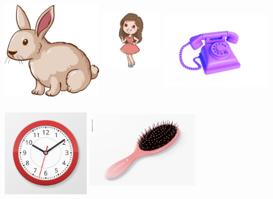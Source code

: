 \includegraphics[width=1.66771in,height=1.63535in]{media/image70.png}
\includegraphics[width=1.03234in,height=1.99479in]{media/image72.png} 
\includegraphics[width=1.86146in,height=1.63165in]{media/image73.png}
\includegraphics[width=1.44836in,height=1.64634in]{media/image74.png}
\includegraphics[width=1.86458in,height=1.77083in]{media/image75.png}
